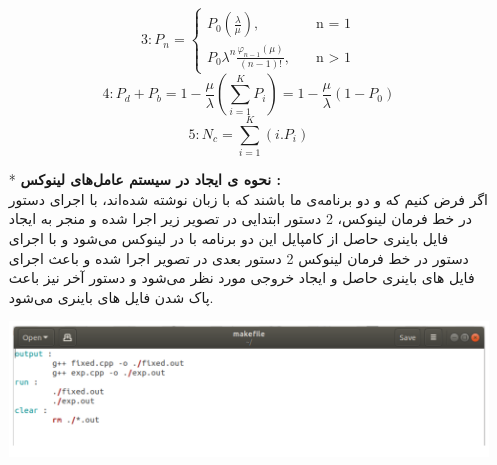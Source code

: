 \documentclass[12pt]{article}
\begin{document}
\begin{itemize}
{\[	\]
	\[
	3: P_n =
	\begin{cases}
	    P_0(\frac{\lambda}{\mu}),
		&\quad\text{n = 1} \\
		P_0\lambda^n\frac{\varphi_{n-1}(\mu)}{(n-1)!},
		&\quad\text{n > 1}
	\end{cases}
	\]
	\[
    4: P_d + P_b = 1 - \frac{\mu}{\lambda}(\sum_{i=1}^{K} P_i) = 1 - \frac{\mu}{\lambda}(1 - P_0)
	\]
	\[
    5: N_c = \sum_{i=1}^{K} (i.P_i)
    \]}
    \item[*]
	\textbf{نحوه ی ایجاد  در سیستم عامل‌های لینوکس :}
	\\
	اگر فرض کنیم که 
	 و
	دو برنامه‌ی ما باشند که 
	با زبان  نوشته شده‌اند، 
	با اجرای دستور 
	در خط فرمان لینوکس، 2 دستور ابتدایی در تصویر زیر اجرا شده و منجر به ایجاد فایل باینری حاصل از کامپایل این دو برنامه با 
	در لینوکس می‌شود و با اجرای دستور 
	در خط فرمان لینوکس 2 دستور بعدی در تصویر اجرا شده و باعث اجرای فایل های باینری حاصل و ایجاد خروجی مورد نظر
می‌شود و دستور آخر نیز باعث پاک شدن فایل های باینری می‌شود.
    \begin{center}
	    \includegraphics[width=1\textwidth]{Content/guide.png}
	\end{center}
	\end{itemize}
\end{document}
